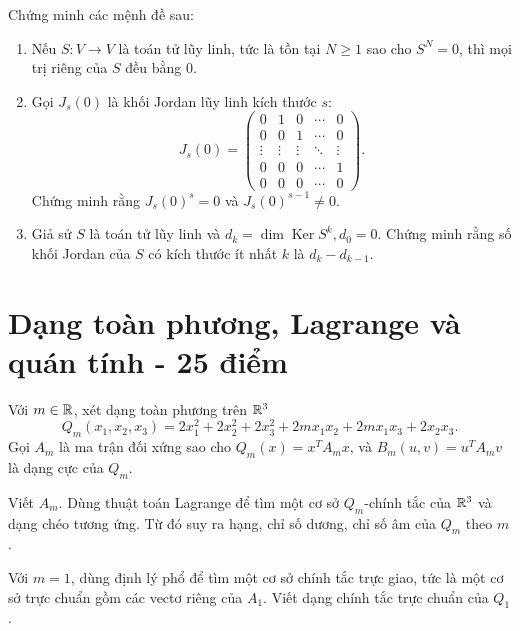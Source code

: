 ﻿\documentclass[12pt,a4paper]{article}
\DeclareMathOperator{\Ker}{Ker}
\begin{document}
\begin{problem}[7 điểm]


Chứng minh các mệnh đề sau:
\begin{enumerate}[label=(\alph*)]
    \item Nếu \(S:V\to V\) là toán tử lũy linh, tức là tồn tại \(N\ge 1\) sao cho \(S^N=0\), thì mọi trị riêng của \(S\) đều bằng \(0\).
    \item Gọi \(J_s(0)\) là khối Jordan lũy linh kích thước \(s\):
    \[
    J_s(0)=
    \begin{pmatrix}
    0&1&0&\cdots&0\\
    0&0&1&\cdots&0\\
    \vdots&\vdots&\vdots&\ddots&\vdots\\
    0&0&0&\cdots&1\\
    0&0&0&\cdots&0
    \end{pmatrix}.
    \]
    Chứng minh rằng $J_s(0)^s=0$ và $J_s(0)^{s-1}\ne0$.

    \item Giả sử \(S\) là toán tử lũy linh và $d_k=\dim\Ker S^k, d_0 = 0$. Chứng minh rằng  số khối Jordan của $S$ có kích thước ít nhất $k$ là $d_k-d_{k-1}$.
    \end{enumerate}
\end{problem}


\section[Dạng toàn phương, Lagrange và quán tính]{Dạng toàn phương, Lagrange và quán tính - 25 điểm}

Với $m\in\mathbb{R}$, xét dạng toàn phương trên $\mathbb{R}^3$
\[
Q_m(x_1,x_2,x_3)=2x_1^2+2x_2^2+2x_3^2
+2mx_1x_2+2mx_1x_3+2x_2x_3.
\]
Gọi $A_m$ là ma trận đối xứng sao cho $Q_m(x)=x^TA_mx$, và $B_m(u,v)=u^TA_mv$ là dạng cực của $Q_m$.

\begin{problem}[5 điểm]

Viết $A_m$. Dùng thuật toán Lagrange để tìm một cơ sở $Q_m$-chính tắc của $\mathbb{R}^3$ và dạng chéo tương ứng. Từ đó suy ra hạng, chỉ số dương, chỉ số âm của $Q_m$ theo $m$.

\end{problem}

\begin{problem}[4 điểm]

Với $m=1$, dùng định lý phổ để tìm một cơ sở chính tắc trực giao, tức là một cơ sở trực chuẩn gồm các vectơ riêng của $A_1$. Viết dạng chính tắc trực chuẩn của $Q_1$.

\end{problem}
\end{document}
